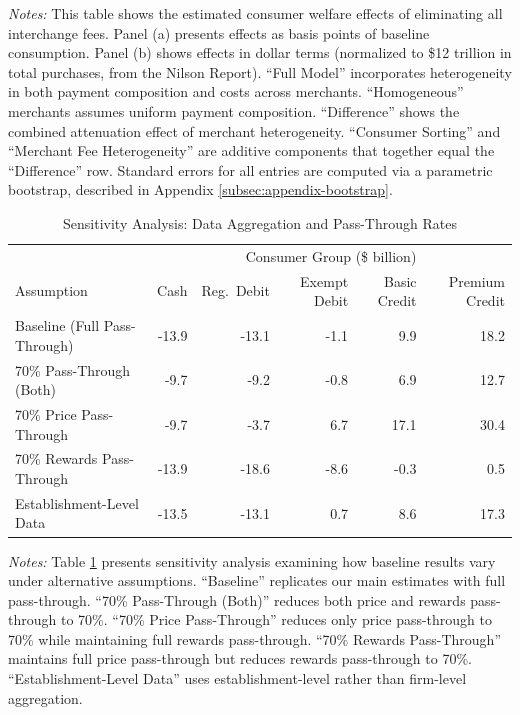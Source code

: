 \documentclass[11pt,english]{article}
\theoremstyle{remark}
\begin{document}
\begin{table}[H]
  \vspace{0.8em}
 
  \par\textit{Notes:} This table shows the estimated consumer welfare effects of eliminating all interchange fees. Panel (a) presents effects as basis points of baseline consumption. Panel (b) shows effects in dollar terms (normalized to \$12 trillion in total purchases, from the Nilson Report). ``Full Model'' incorporates heterogeneity in both payment composition and costs across merchants. ``Homogeneous'' merchants assumes uniform payment composition. ``Difference'' shows the combined attenuation effect of merchant heterogeneity. ``Consumer Sorting'' and ``Merchant Fee Heterogeneity'' are additive components that together equal the ``Difference'' row. Standard errors for all entries are computed via a parametric bootstrap, described in Appendix \ref{subsec:appendix-bootstrap}.
\end{table}

\clearpage

\begin{table}[H]
  \centering
  \caption{Sensitivity Analysis: Data Aggregation and Pass-Through Rates}
  \label{tab:sensitivity-analysis}
  

  \begin{tabular}{lrrrrr}
\toprule
 & \multicolumn{5}{c}{Consumer Group (\$ billion)} \\
Assumption & Cash & Reg.\ Debit & Exempt Debit & Basic Credit & Premium Credit \\
\midrule
Baseline (Full Pass-Through) & -13.9 & -13.1 & -1.1 & 9.9 & 18.2 \\
70\% Pass-Through (Both) & -9.7 & -9.2 & -0.8 & 6.9 & 12.7 \\
70\% Price Pass-Through & -9.7 & -3.7 & 6.7 & 17.1 & 30.4 \\
70\% Rewards Pass-Through & -13.9 & -18.6 & -8.6 & -0.3 & 0.5 \\
Establishment-Level Data & -13.5 & -13.1 & 0.7 & 8.6 & 17.3 \\
\bottomrule
\end{tabular}

 
  \par\textit{Notes:} Table \ref{tab:sensitivity-analysis} presents sensitivity analysis examining how baseline results vary under alternative assumptions. ``Baseline'' replicates our main estimates with full pass-through. ``70\% Pass-Through (Both)'' reduces both price and rewards pass-through to 70\%. ``70\% Price Pass-Through'' reduces only price pass-through to 70\% while maintaining full rewards pass-through. ``70\% Rewards Pass-Through'' maintains full price pass-through but reduces rewards pass-through to 70\%. ``Establishment-Level Data'' uses establishment-level rather than firm-level aggregation.
\end{table}
\end{document}
